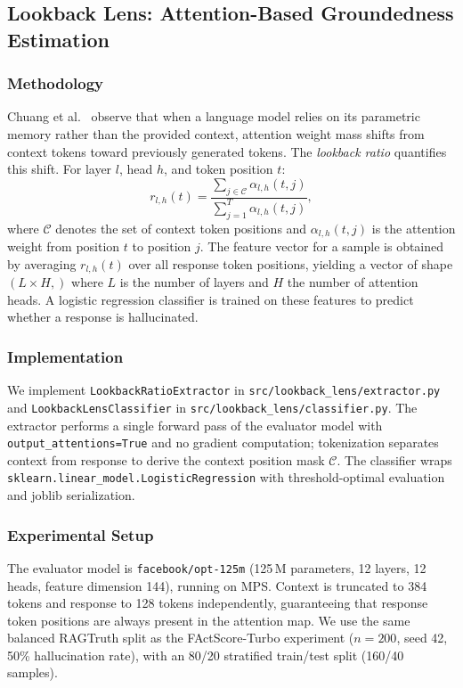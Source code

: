 \subsection{Lookback Lens: Attention-Based Groundedness Estimation}
\label{sec:lookback_lens}

\subsubsection{Methodology}

Chuang et al.~\cite{lookback_lens_2024} observe that when a language model relies on
its parametric memory rather than the provided context, attention weight mass shifts
from context tokens toward previously generated tokens.
The \emph{lookback ratio} quantifies this shift.
For layer $l$, head $h$, and token position $t$:
\[
  r_{l,h}(t) = \frac{\displaystyle\sum_{j \in \mathcal{C}} \alpha_{l,h}(t,j)}
                    {\displaystyle\sum_{j=1}^{T} \alpha_{l,h}(t,j)},
\]
where $\mathcal{C}$ denotes the set of context token positions and
$\alpha_{l,h}(t,j)$ is the attention weight from position $t$ to position $j$.
The feature vector for a sample is obtained by averaging $r_{l,h}(t)$ over all response
token positions, yielding a vector of shape $(L \times H,)$ where $L$ is the number of
layers and $H$ the number of attention heads.
A logistic regression classifier is trained on these features to predict whether a
response is hallucinated.

\subsubsection{Implementation}

We implement \texttt{LookbackRatioExtractor} in \texttt{src/lookback\_lens/extractor.py}
and \texttt{LookbackLensClassifier} in \texttt{src/lookback\_lens/classifier.py}.
The extractor performs a single forward pass of the evaluator model with
\texttt{output\_attentions=True} and no gradient computation; tokenization separates
context from response to derive the context position mask $\mathcal{C}$.
The classifier wraps \texttt{sklearn.linear\_model.LogisticRegression} with
threshold-optimal evaluation and joblib serialization.

\subsubsection{Experimental Setup}

The evaluator model is \texttt{facebook/opt-125m} (125\,M parameters, 12 layers,
12 heads, feature dimension 144), running on MPS.
Context is truncated to 384 tokens and response to 128 tokens independently,
guaranteeing that response token positions are always present in the attention map.
We use the same balanced RAGTruth split as the FActScore-Turbo experiment
($n = 200$, seed 42, 50\% hallucination rate), with an 80/20 stratified
train/test split (160/40 samples).

